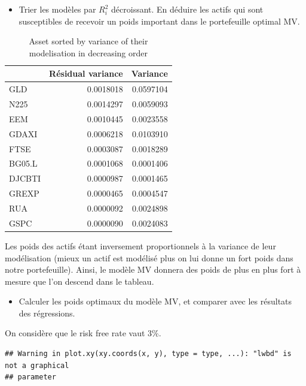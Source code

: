 \documentclass[
]{article}
\providecommand{\tightlist}{%
  \setlength{\itemsep}{0pt}\setlength{\parskip}{0pt}}
\begin{document}
\begin{itemize}
\tightlist
\item
  Trier les modèles par \(R_i^2\) décroissant. En déduire les actifs qui
  sont susceptibles de recevoir un poids important dans le portefeuille
  optimal MV.
\end{itemize}

\begin{table}[H]

\caption{\label{tab:unnamed-chunk-3}Asset sorted by variance of their modelisation in decreasing order}
\centering
\begin{tabular}[t]{lrr}
\toprule
  & Résidual variance & Variance\\
\midrule
GLD & 0.0018018 & 0.0597104\\
N225 & 0.0014297 & 0.0059093\\
EEM & 0.0010445 & 0.0023558\\
GDAXI & 0.0006218 & 0.0103910\\
FTSE & 0.0003087 & 0.0018289\\
\addlinespace
BG05.L & 0.0001068 & 0.0001406\\
DJCBTI & 0.0000987 & 0.0001465\\
GREXP & 0.0000465 & 0.0004547\\
RUA & 0.0000092 & 0.0024898\\
GSPC & 0.0000090 & 0.0024083\\
\bottomrule
\end{tabular}
\end{table}

Les poids des actifs étant inversement proportionnels à la variance de
leur modélisation (mieux un actif est modélisé plus on lui donne un fort
poids dans notre portefeuille). Ainsi, le modèle MV donnera des poids de
plus en plus fort à mesure que l'on descend dans le tableau.

\begin{itemize}
\tightlist
\item
  Calculer les poids optimaux du modèle MV, et comparer avec les
  résultats des régressions.
\end{itemize}

On considère que le risk free rate vaut 3\%.

\begin{verbatim}
## Warning in plot.xy(xy.coords(x, y), type = type, ...): "lwbd" is not a graphical
## parameter
\end{verbatim}
\end{document}
